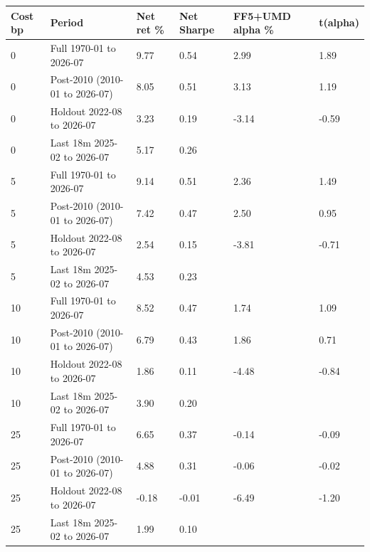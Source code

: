 \begin{tabular}{llllll}
\toprule
Cost bp & Period & Net ret \% & Net Sharpe & FF5+UMD alpha \% & t(alpha) \\
\midrule
0 & Full 1970-01 to 2026-07 & 9.77 & 0.54 & 2.99 & 1.89 \\
0 & Post-2010 (2010-01 to 2026-07) & 8.05 & 0.51 & 3.13 & 1.19 \\
0 & Holdout 2022-08 to 2026-07 & 3.23 & 0.19 & -3.14 & -0.59 \\
0 & Last 18m 2025-02 to 2026-07 & 5.17 & 0.26 &  &  \\
5 & Full 1970-01 to 2026-07 & 9.14 & 0.51 & 2.36 & 1.49 \\
5 & Post-2010 (2010-01 to 2026-07) & 7.42 & 0.47 & 2.50 & 0.95 \\
5 & Holdout 2022-08 to 2026-07 & 2.54 & 0.15 & -3.81 & -0.71 \\
5 & Last 18m 2025-02 to 2026-07 & 4.53 & 0.23 &  &  \\
10 & Full 1970-01 to 2026-07 & 8.52 & 0.47 & 1.74 & 1.09 \\
10 & Post-2010 (2010-01 to 2026-07) & 6.79 & 0.43 & 1.86 & 0.71 \\
10 & Holdout 2022-08 to 2026-07 & 1.86 & 0.11 & -4.48 & -0.84 \\
10 & Last 18m 2025-02 to 2026-07 & 3.90 & 0.20 &  &  \\
25 & Full 1970-01 to 2026-07 & 6.65 & 0.37 & -0.14 & -0.09 \\
25 & Post-2010 (2010-01 to 2026-07) & 4.88 & 0.31 & -0.06 & -0.02 \\
25 & Holdout 2022-08 to 2026-07 & -0.18 & -0.01 & -6.49 & -1.20 \\
25 & Last 18m 2025-02 to 2026-07 & 1.99 & 0.10 &  &  \\
\bottomrule
\end{tabular}
